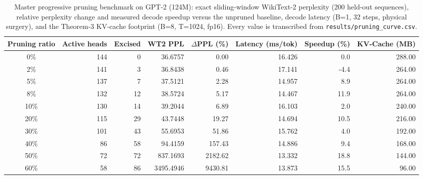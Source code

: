 \documentclass[10pt,journal,compsoc]{IEEEtran}
\begin{document}
\begin{table}[!t]
\caption{Master progressive pruning benchmark on GPT-2 (124M): exact sliding-window
WikiText-2 perplexity (200 held-out sequences), relative perplexity change and
measured decode speedup versus the unpruned baseline, decode latency (B=1, 32
steps, physical surgery), and the Theorem-3 KV-cache footprint (B=8, T=1024,
fp16). Every value is transcribed from \texttt{results/pruning\_curve.csv}.}
\label{tab:master}
\centering
\small
\begin{tabular}{crrrrrrr}
\toprule
Pruning ratio & Active heads & Excised & WT2 PPL & $\Delta$PPL (\%) & Latency (ms/tok) & Speedup (\%) & KV-Cache (MB) \\
\midrule
0\% & 144 & 0 & 36.6757 & 0.00 & 16.426 & 0.0 & 288.00 \\
2\% & 141 & 3 & 36.8438 & 0.46 & 17.141 & -4.4 & 264.00 \\
5\% & 137 & 7 & 37.5121 & 2.28 & 14.957 & 8.9 & 264.00 \\
8\% & 132 & 12 & 38.5724 & 5.17 & 14.467 & 11.9 & 264.00 \\
10\% & 130 & 14 & 39.2044 & 6.89 & 16.103 & 2.0 & 240.00 \\
20\% & 115 & 29 & 43.7448 & 19.27 & 14.694 & 10.5 & 216.00 \\
30\% & 101 & 43 & 55.6953 & 51.86 & 15.762 & 4.0 & 192.00 \\
40\% & 86 & 58 & 94.4159 & 157.43 & 14.886 & 9.4 & 168.00 \\
50\% & 72 & 72 & 837.1693 & 2182.62 & 13.332 & 18.8 & 144.00 \\
60\% & 58 & 86 & 3495.4946 & 9430.81 & 13.873 & 15.5 & 96.00 \\
\bottomrule
\end{tabular}
\end{table}
\end{document}
